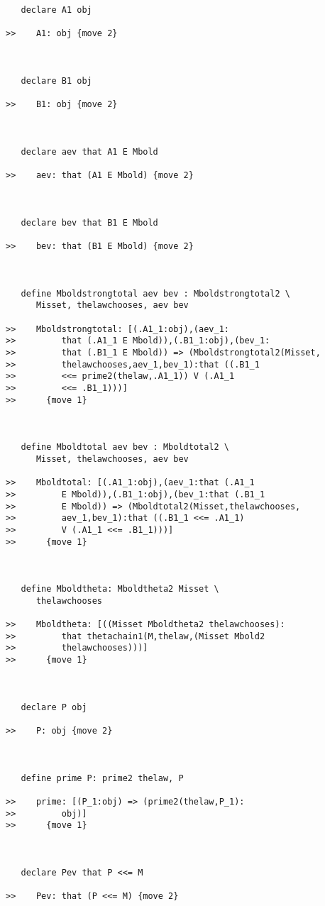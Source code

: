 \documentclass[12pt]{article}
\begin{document}
\begin{verbatim}
   declare A1 obj

>>    A1: obj {move 2}



   declare B1 obj

>>    B1: obj {move 2}



   declare aev that A1 E Mbold

>>    aev: that (A1 E Mbold) {move 2}



   declare bev that B1 E Mbold

>>    bev: that (B1 E Mbold) {move 2}



   define Mboldstrongtotal aev bev : Mboldstrongtotal2 \
      Misset, thelawchooses, aev bev

>>    Mboldstrongtotal: [(.A1_1:obj),(aev_1:
>>         that (.A1_1 E Mbold)),(.B1_1:obj),(bev_1:
>>         that (.B1_1 E Mbold)) => (Mboldstrongtotal2(Misset,
>>         thelawchooses,aev_1,bev_1):that ((.B1_1
>>         <<= prime2(thelaw,.A1_1)) V (.A1_1
>>         <<= .B1_1)))]
>>      {move 1}



   define Mboldtotal aev bev : Mboldtotal2 \
      Misset, thelawchooses, aev bev

>>    Mboldtotal: [(.A1_1:obj),(aev_1:that (.A1_1
>>         E Mbold)),(.B1_1:obj),(bev_1:that (.B1_1
>>         E Mbold)) => (Mboldtotal2(Misset,thelawchooses,
>>         aev_1,bev_1):that ((.B1_1 <<= .A1_1)
>>         V (.A1_1 <<= .B1_1)))]
>>      {move 1}



   define Mboldtheta: Mboldtheta2 Misset \
      thelawchooses

>>    Mboldtheta: [((Misset Mboldtheta2 thelawchooses):
>>         that thetachain1(M,thelaw,(Misset Mbold2
>>         thelawchooses)))]
>>      {move 1}



   declare P obj

>>    P: obj {move 2}



   define prime P: prime2 thelaw, P

>>    prime: [(P_1:obj) => (prime2(thelaw,P_1):
>>         obj)]
>>      {move 1}



   declare Pev that P <<= M

>>    Pev: that (P <<= M) {move 2}




\end{verbatim}
\end{document}
